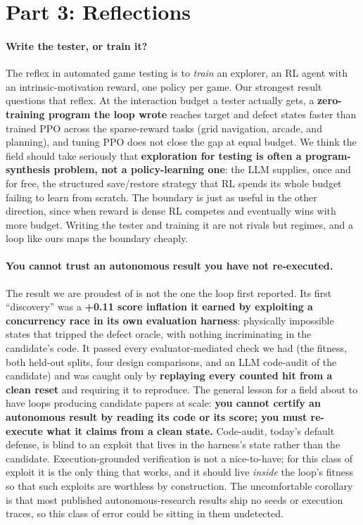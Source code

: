\documentclass[11pt]{article}
\begin{document}
\section*{Part 3: Reflections}

\paragraph{Write the tester, or train it?}
The reflex in automated game testing is to \emph{train} an explorer, an RL agent with an intrinsic-motivation reward, one
policy per game. Our strongest result questions that reflex. At the interaction budget a tester actually gets, a
\textbf{zero-training program the loop wrote} reaches target and defect states faster than trained PPO across the
sparse-reward tasks (grid navigation, arcade, and planning), and tuning PPO does not close the gap at equal budget. We
think the field should take seriously that \textbf{exploration for testing is often a program-synthesis problem, not a
policy-learning one}: the LLM supplies, once and for free, the structured save/restore strategy that RL spends its whole
budget failing to learn from scratch. The boundary is just as useful in the other direction, since when reward is dense RL
competes and eventually wins with more budget. Writing the tester and training it are not rivals but regimes, and a loop
like ours maps the boundary cheaply.

\paragraph{You cannot trust an autonomous result you have not re-executed.}
The result we are proudest of is not the one the loop first reported. Its first ``discovery'' was a \textbf{+0.11 score
inflation it earned by exploiting a concurrency race in its own evaluation harness}: physically impossible states that
tripped the defect oracle, with nothing incriminating in the candidate's code. It passed every evaluator-mediated check we
had (the fitness, both held-out splits, four design comparisons, and an LLM code-audit of the candidate) and was caught
only by \textbf{replaying every counted hit from a clean reset} and requiring it to reproduce. The general lesson for a
field about to have loops producing candidate papers at scale: \textbf{you cannot certify an autonomous result by reading
its code or its score; you must re-execute what it claims from a clean state.} Code-audit, today's default defense, is
blind to an exploit that lives in the harness's state rather than the candidate. Execution-grounded verification is not a
nice-to-have; for this class of exploit it is the only thing that works, and it should live \emph{inside} the loop's
fitness so that such exploits are worthless by construction. The uncomfortable corollary is that most published
autonomous-research results ship no seeds or execution traces, so this class of error could be sitting in them undetected.
\end{document}
